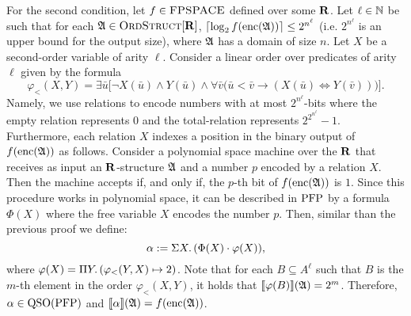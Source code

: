 For the second condition, let $f\in \text{\sc FPSPACE}$ defined over some $\mathbf{R}$. Let $\ell\in\mathbb{N}$ be such that for each $\mathfrak{A}\in\text{\sc OrdStruct}[\mathbf{R}]$, $\lceil\log_2 f({\rm enc}(\mathfrak{A})) \rceil \leq 2^{n^\ell}$ (i.e. $2^{n^\ell}$ is an upper bound for the output size), where $\mathfrak{A}$ has a domain of size $n$. Let $X$ be a second-order variable of arity $\ell$. Consider a linear order over predicates of arity $\ell$ given by the formula 
$$
\varphi_{<}(X,Y) = \exists\bar{u}\big[\neg X(\bar{u})\wedge Y(\bar{u})\wedge \forall\bar{v}\big(
\bar{u}<\bar{v}\to(X(\bar{u})\iff Y(\bar{v}))\big)\big].
$$
Namely, we use relations to encode numbers with at most $2^{n^\ell}$-bits where the empty relation represents $0$ and the total-relation represents $2^{2^{n^\ell}}-1$.
Furthermore, each relation $X$ indexes a position in the binary output of $f({\rm enc}(\mathfrak{A}))$ as follows.
Consider a polynomial space machine over the $\mathbf{R}$ that receives as input an $\mathbf{R}$-structure $\mathfrak{A}$ and a number $p$ encoded by a relation $X$. Then the machine accepts if, and only if, the $p$-th bit of $f({\rm enc}(\mathfrak{A}))$ is $1$. 
Since this procedure works in polynomial space, it can be described in ${\rm PFP}$ \cite{AbiteboulV89} by a formula $\Phi(X)$ where the free variable $X$ encodes the number $p$. Then, similar than the previous proof we define:
$$
\alpha := \Sigma{X}.\,(\Phi(X)\cdot\varphi(X)),
$$ 
where $\varphi(X) = \Pi{Y}.\,(\varphi_{<}(Y,X)\mapsto 2)$. Note that for each $B\subseteq A^{\ell}$ such that $B$ is the $m$-th element in the order $\varphi_{<}(X,Y)$, it holds that ${\llbracket{}{\varphi(B)}\rrbracket}(\mathfrak{A}) = 2^m$. Therefore, $\alpha\in{\rm QSO}({\rm PFP})$ and ${\llbracket{}{\alpha}\rrbracket}(\mathfrak{A}) = f({\rm enc}(\mathfrak{A}))$.